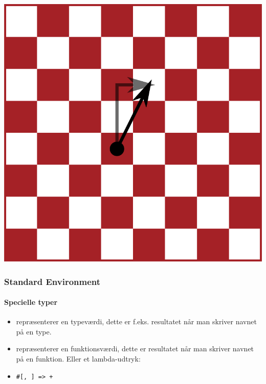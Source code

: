 \begin{frame}
\begin{center}
\hspace{0.5cm}
\includegraphics{niels/direction_nne.png}
\end{center}
\end{frame}

\begin{frame}
\frametitle{Standard Environment}
\framesubtitle{Specielle typer}
\begin{itemize}
\item {} repræsenterer en typeværdi, dette er f.eks. resultatet når man skriver navnet på en type.\pause
\item {} repræsenterer en funktionsværdi, dette er resultatet når man skriver navnet på en funktion. Eller et lambda-udtryk:
\item \texttt{\#[, ] =>  + }
\end{itemize}
\end{frame}

